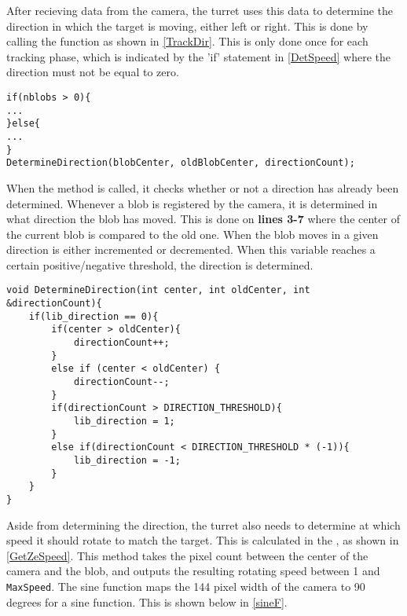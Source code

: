 After recieving data from the camera, the turret uses this data to determine the
direction in which the target is moving, either left or right. This is done by
calling the  function as shown in
\autoref{TrackDir}. This is only done once for each tracking phase, which is
indicated by the 'if' statement in \autoref{DetSpeed} where the direction
must not be equal to zero.\nl

\begin{minipage}[H]{\linewidth}
\begin{lstlisting}[caption = Call DetermineDirection., label = TrackDir]
if(nblobs > 0){
...
}else{
...
}
DetermineDirection(blobCenter, oldBlobCenter, directionCount);
\end{lstlisting}
\end{minipage}

When the  method is called, it checks
whether or not a direction has already been determined. Whenever a blob is
registered by the camera, it is determined in what direction the blob has
moved. This is done on \textbf{lines 3-7} where the center of the
current blob is compared to the old one. When the blob moves in a given
direction  is either incremented or decremented.
When this variable reaches a certain positive/negative threshold, the direction
is determined.\nl

\begin{minipage}[H]{\linewidth}
\begin{lstlisting}[caption = Determine the targets direction., label = DeterDir]
void DetermineDirection(int center, int oldCenter, int &directionCount){
	if(lib_direction == 0){
		if(center > oldCenter){
    		directionCount++;
		}
    	else if (center < oldCenter) {
    		directionCount--;
   		}
    	if(directionCount > DIRECTION_THRESHOLD){
    		lib_direction = 1;
    	}
    	else if(directionCount < DIRECTION_THRESHOLD * (-1)){
    		lib_direction = -1;
    	}
    }
}
\end{lstlisting}
\end{minipage}

Aside from determining the direction, the turret also needs to determine at
which speed it should rotate to match the target. This is calculated in the
, as shown in \autoref{GetZeSpeed}. This method
takes the pixel count between the center of the camera and the blob, and outputs
the resulting rotating speed between 1 and \texttt{MaxSpeed}. The sine function
maps the 144 pixel width of the camera to 90 degrees for a sine function. This is shown below in
\autoref{sineF}.

